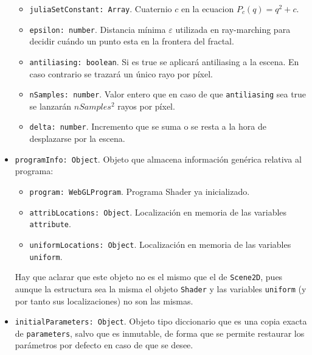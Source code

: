 \begin{itemize}
\begin{itemize}
        \item \verb|juliaSetConstant: Array|. Cuaternio $c$ en la ecuacion $P_c(q) = q^2 + c$.
        \item \verb|epsilon: number|. Distancia mínima $\varepsilon$ utilizada en ray-marching para decidir cuándo un punto esta en la frontera del fractal.
        \item \verb|antiliasing: boolean|. Si es true se aplicará antiliasing a la escena. En caso contrario se trazará un único rayo por píxel.
        \item \verb|nSamples: number|. Valor entero que en caso de que \verb|antiliasing| sea true se lanzarán $nSamples^2$ rayos por píxel.
        \item \verb|delta: number|. Incremento que se suma o se resta a la hora de desplazarse por la escena.
    \end{itemize}
    \item \verb|programInfo: Object|. Objeto que almacena información genérica relativa al programa:
    \begin{itemize}
        \item \verb|program: WebGLProgram|. Programa Shader ya inicializado.
        \item \verb|attribLocations: Object|. Localización en memoria de las variables \verb|attribute|.
        \item \verb|uniformLocations: Object|. Localización en memoria de las variables \verb|uniform|.
    \end{itemize}

    Hay que aclarar que este objeto no es el mismo que el de \verb|Scene2D|, pues aunque la estructura sea la misma el objeto \verb|Shader| y las variables \verb|uniform| (y por tanto sus localizaciones) no son las mismas.
    \item \verb|initialParameters: Object|. Objeto tipo diccionario que es una copia exacta de \verb|parameters|, salvo que es inmutable, de forma que se permite restaurar los parámetros por defecto en caso de que se desee.
\end{itemize}
